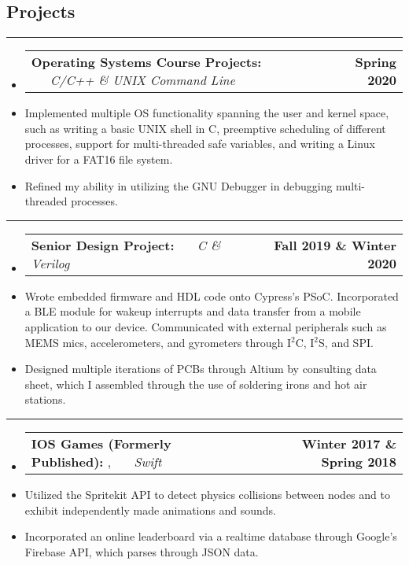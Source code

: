 \documentclass[10pt,letterpaper]{article}
\makeatletter
\newcommand{\items}[2]
{
	\begin{tabular*}{\linewidth}{l @{\extracolsep{\fill}} r}
		#1 & #2 \\
	\end{tabular*}
}
\newcommand{\sectionbreak}
{
	\vspace{-1.2em}
	\rule{\textwidth}{1.7pt}
	\vspace{-1.7em}
}
\makeatother
\begin{document}
\vspace{-1.5em}

\subsection*{Projects}
\sectionbreak

\begin{itemize}
	\item[]
		\items
			{\textbf{Operating Systems Course Projects:} \ \ \ \footnotesize  \emph{C/C++ \& UNIX Command Line} }
			{\textbf{Spring 2020}}
		\item
			Implemented multiple OS functionality spanning the user and kernel space, such as writing a basic UNIX shell in C, preemptive scheduling of different processes, support for multi-threaded safe variables, and writing a Linux driver for a FAT16 file system.
		\item 
			Refined my ability in utilizing the GNU Debugger in debugging multi-threaded processes.
\end{itemize}

\hrule 

\begin{itemize}
	\item[]
		\items 
		{
			\textbf{Senior Design Project: }
			\emph{\smash{Smart Dog Collar}} \ \ \ \footnotesize \emph{C \& Verilog}
		}
			{\textbf{Fall 2019 \& Winter 2020}}
		\item 
			Wrote embedded firmware and HDL code onto Cypress's PSoC. Incorporated a BLE module for wakeup interrupts and data transfer from a mobile application to our device. Communicated with external peripherals such as MEMS mics, accelerometers, and gyrometers through I$^{2}$C, I$^{2}$S, and SPI. 
		\item
			Designed multiple iterations of PCBs through Altium by consulting data sheet, which I assembled through the use of soldering irons and hot air stations.

\end{itemize}

\hrule

\begin{itemize}
	\item[]
		\items 
		{
			\textbf{IOS Games (Formerly Published): }
			\href{https://appadvice.com/app/round-bound/1369632746}{\emph{\underline{\smash{Round 'a Bound}}}}, 
			\href{https://appadvice.com/app/tic-tac-emoji/1346934986}{\emph{\underline{\smash{Tic-Tac Emoji}}}} \ \ \ \footnotesize  \emph{Swift}
		}
			{\textbf{Winter 2017 \& Spring 2018}}
		\item 
			Utilized the Spritekit API to detect physics collisions between nodes and to exhibit independently made animations and sounds.
		\item
			Incorporated an online leaderboard via a realtime database through Google's Firebase API, which parses through JSON data. 
\end{itemize}
\end{document}
